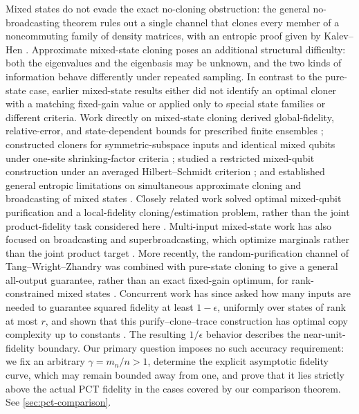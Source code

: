\documentclass[11pt]{article}
\theoremstyle{remark}
\theoremstyle{plain}
\begin{document}
Mixed states do not
evade the exact no-cloning obstruction: the general
no-broadcasting theorem rules out a single channel that clones every member
of a noncommuting family of density matrices, with an entropic proof given by
Kalev--Hen
\cite{BarnumCavesFuchsJozsaSchumacher1996,KalevHen2008}.  Approximate
mixed-state cloning poses an additional structural difficulty: both the
eigenvalues and the eigenbasis may be unknown, and the two kinds of
information behave differently under repeated sampling.  In contrast to the
pure-state case, earlier mixed-state results either did
not identify an optimal cloner with a matching fixed-gain value or applied
only to special state families or different criteria.  Work directly on
mixed-state cloning derived global-fidelity, relative-error, and
state-dependent bounds for prescribed finite ensembles
\cite{Rastegin2003Upper,Rastegin2002Relative,
Rastegin2003StateDependent}; constructed cloners for symmetric-subspace inputs
and identical mixed qubits under one-site shrinking-factor criteria
\cite{Fan2003,FanLiuShi2007}; studied a restricted mixed-qubit construction
under an averaged Hilbert--Schmidt criterion \cite{Kazakov2007}; and established
general entropic limitations on simultaneous approximate cloning and
broadcasting of mixed states \cite{LemmWilde2017}.  Closely related work solved
optimal mixed-qubit purification and a local-fidelity cloning/estimation
problem, rather than the joint product-fidelity task considered here
\cite{CiracEkertMacchiavello1999}.  Multi-input mixed-state work has also
focused on broadcasting and superbroadcasting, which optimize marginals
rather than the joint product target
\cite{DArianoMacchiavelloPerinotti2005,
BuscemiDArianoMacchiavelloPerinotti2005Optimal,
BuscemiDArianoMacchiavelloPerinotti2006,DangFan2007}.  More recently, the
random-purification channel of Tang--Wright--Zhandry was combined with
pure-state cloning to give a general all-output guarantee, rather than an
exact fixed-gain optimum, for rank-constrained mixed states
\cite{TangWrightZhandry2025,LiTheilHarrowChuang2026}.  Concurrent work has
since asked how many inputs are needed to guarantee squared fidelity at least
\(1-\epsilon\), uniformly over states of rank at most \(r\), and shown that this
purify--clone--trace construction has optimal copy complexity up to constants
\cite{FanizzaGrinkoScharnhorstSpilecki2026,JeonSohnOh2026}.  The resulting
\(1/\epsilon\) behavior describes the near-unit-fidelity boundary.  Our
primary question imposes no such accuracy requirement: we fix an arbitrary
\(\gamma=m_n/n>1\), determine the explicit asymptotic fidelity curve, which
may remain bounded away from one, and prove that it lies strictly above the
actual PCT fidelity in the cases covered by our comparison theorem.  See
\cref{sec:pct-comparison}.
\end{document}
